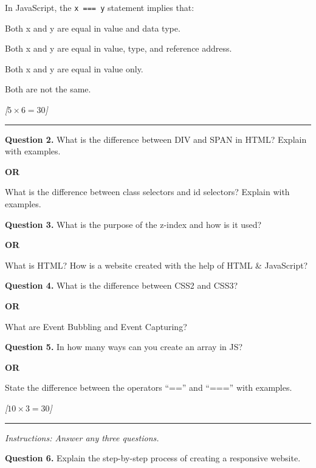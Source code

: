\documentclass[11pt,a4paper]{article}
\newcommand{\pts}[1]{\hfill   \textit{[#1]}}
\begin{document}
\begin{parts}
  \item In JavaScript, the   \texttt{x === y} statement implies that:
  
\begin{parts}
    \item Both x and y are equal in value and data type.
    \item Both x and y are equal in value, type, and reference address.
    \item Both x and y are equal in value only.
    \item Both are not the same.
  \end{parts}
\end{parts}

\bigskip


\pts{$5  \times 6 = 30$}
\rule{\linewidth}{0.4pt}\smallskip

\medskip


\noindent   \textbf{Question 2.} What is the difference between DIV and SPAN in HTML? Explain with examples.
\centerline{   \textbf{OR}}
What is the difference between class selectors and id selectors? Explain with examples.

\medskip


\noindent   \textbf{Question 3.} What is the purpose of the z-index and how is it used?
\centerline{   \textbf{OR}}
What is HTML? How is a website created with the help of HTML \& JavaScript?

\medskip


\noindent   \textbf{Question 4.} What is the difference between CSS2 and CSS3?
\centerline{   \textbf{OR}}
What are Event Bubbling and Event Capturing?

\medskip


\noindent   \textbf{Question 5.} In how many ways can you create an array in JS?
\centerline{   \textbf{OR}}
State the difference between the operators ``=='' and ``==='' with examples.

\bigskip


\pts{$10  \times 3 = 30$}
\rule{\linewidth}{0.4pt}\smallskip




\noindent   \textit{Instructions: Answer any three questions.}

\medskip


\noindent   \textbf{Question 6.} Explain the step-by-step process of creating a responsive website.
\end{document}
